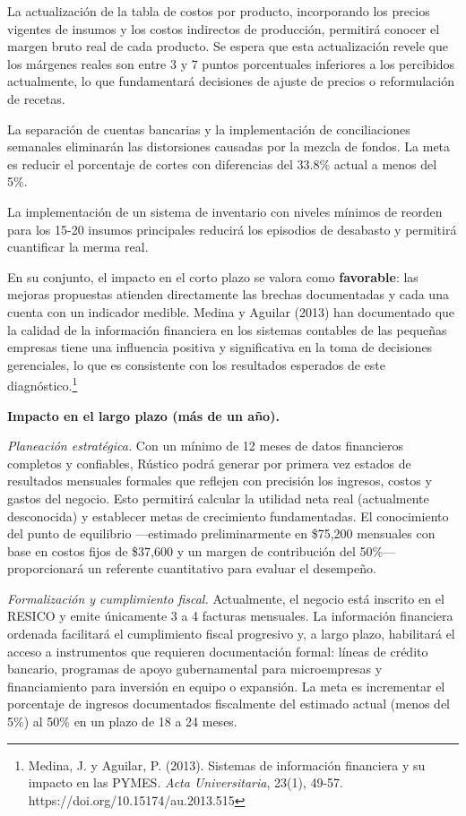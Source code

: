 \documentclass[
  12pt,
  spanish,
]{article}
\begin{document}
La actualización de la tabla de costos por producto, incorporando los
precios vigentes de insumos y los costos indirectos de producción,
permitirá conocer el margen bruto real de cada producto. Se espera que
esta actualización revele que los márgenes reales son entre 3 y 7 puntos
porcentuales inferiores a los percibidos actualmente, lo que
fundamentará decisiones de ajuste de precios o reformulación de recetas.

La separación de cuentas bancarias y la implementación de conciliaciones
semanales eliminarán las distorsiones causadas por la mezcla de fondos.
La meta es reducir el porcentaje de cortes con diferencias del 33.8\%
actual a menos del 5\%.

La implementación de un sistema de inventario con niveles mínimos de
reorden para los 15-20 insumos principales reducirá los episodios de
desabasto y permitirá cuantificar la merma real.

En su conjunto, el impacto en el corto plazo se valora como
\textbf{favorable}: las mejoras propuestas atienden directamente las
brechas documentadas y cada una cuenta con un indicador medible. Medina
y Aguilar (2013) han documentado que la calidad de la información
financiera en los sistemas contables de las pequeñas empresas tiene una
influencia positiva y significativa en la toma de decisiones
gerenciales, lo que es consistente con los resultados esperados de este
diagnóstico.\footnote{Medina, J. y Aguilar, P. (2013). Sistemas de
  información financiera y su impacto en las PYMES. \emph{Acta
  Universitaria}, 23(1), 49-57. https://doi.org/10.15174/au.2013.515}

\textbf{Impacto en el largo plazo (más de un año).}

\emph{Planeación estratégica.} Con un mínimo de 12 meses de datos
financieros completos y confiables, Rústico podrá generar por primera
vez estados de resultados mensuales formales que reflejen con precisión
los ingresos, costos y gastos del negocio. Esto permitirá calcular la
utilidad neta real (actualmente desconocida) y establecer metas de
crecimiento fundamentadas. El conocimiento del punto de equilibrio
---estimado preliminarmente en \$75,200 mensuales con base en costos
fijos de \$37,600 y un margen de contribución del 50\%--- proporcionará
un referente cuantitativo para evaluar el desempeño.

\emph{Formalización y cumplimiento fiscal.} Actualmente, el negocio está
inscrito en el RESICO y emite únicamente 3 a 4 facturas mensuales. La
información financiera ordenada facilitará el cumplimiento fiscal
progresivo y, a largo plazo, habilitará el acceso a instrumentos que
requieren documentación formal: líneas de crédito bancario, programas de
apoyo gubernamental para microempresas y financiamiento para inversión
en equipo o expansión. La meta es incrementar el porcentaje de ingresos
documentados fiscalmente del estimado actual (menos del 5\%) al 50\% en
un plazo de 18 a 24 meses.
\end{document}
